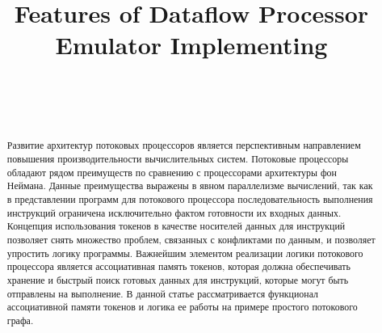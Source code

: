 \documentclass[
11pt,%
tightenlines,%
twoside,%
onecolumn,%
nofloats,%
nobibnotes,%
nofootinbib,%
superscriptaddress,%
noshowpacs,%
centertags]%
{revtex4}
\begin{document}

\title{Features of Dataflow Processor Emulator Implementing}

\author{~}

\author{~}



\begin{abstract}
Развитие архитектур потоковых процессоров является перспективным направлением повышения производительности вычислительных систем.
Потоковые процессоры обладают рядом преимуществ по сравнению с процессорами архитектуры фон Неймана.
Данные преимущества выражены в явном параллелизме вычислений, так как в представлении программ для потокового процессора последовательность выполнения инструкций ограничена исключительно фактом готовности их входных данных.
Концепция использования токенов в качестве носителей данных для инструкций позволяет снять множество проблем, связанных с конфликтами по данным, и позволяет упростить логику программы.
Важнейшим элементом реализации логики потокового процессора является ассоциативная память токенов, которая должна обеспечивать хранение и быстрый поиск готовых данных для инструкций, которые могут быть отправлены на выполнение.
В данной статье рассматривается функционал ассоциативной памяти токенов и логика ее работы на примере простого потокового графа.
\end{abstract}



\maketitle
\end{document}
